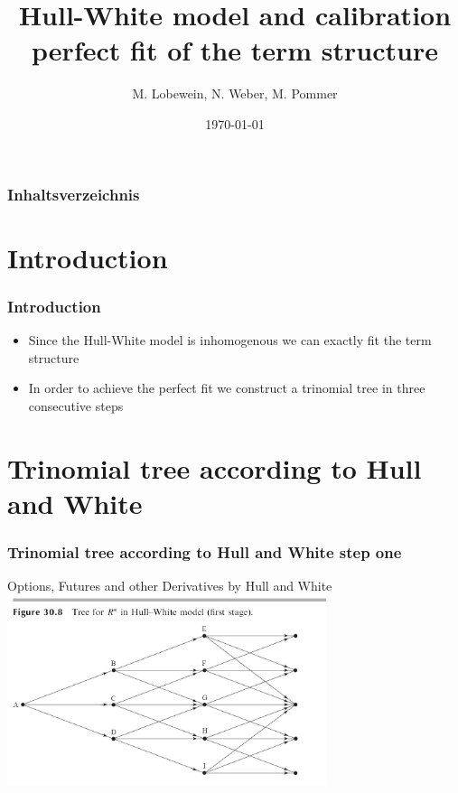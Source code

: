 \documentclass{beamer}
\begin{document}
\title[Hull-White model and calibration]{Hull-White model and calibration\\
perfect fit of the term structure}  



\date{\today} 
\author{M. Lobewein, N. Weber, M. Pommer}



\begin{frame}
\titlepage
\end{frame} 


\begin{frame}
\frametitle[Inhaltsverzeichnis]{Inhaltsverzeichnis}
\vspace{0.4cm}
\tableofcontents
\end{frame} 


\section{Introduction} 
\begin{frame}
\frametitle{Introduction} 
\begin{itemize}
\item Since the Hull-White model is inhomogenous we can exactly fit the term structure
\item In order to achieve the perfect fit we construct a trinomial tree in three consecutive steps
\end{itemize}
\end{frame}


\section{Trinomial tree according to Hull and White} 
\begin{frame}
\frametitle{Trinomial tree according to Hull and White step one} 
\begin{block}{Options, Futures and other Derivatives by Hull and White}
\includegraphics[width=0.7\textwidth]{Trinomialbaum hull White step one}
\end{block}

\end{frame}
\end{document}
